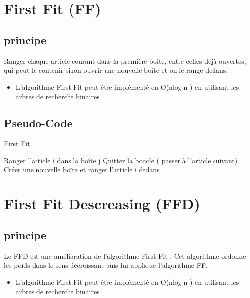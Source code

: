 \documentclass[class=article, crop=false]{standalone}
\begin{document}
\section{First Fit (FF)}
\subsection{principe}
Ranger chaque article courant dans la première boîte, entre celles déjà ouvertes, qui peut le contenir sinon ouvrir une nouvelle boîte et on le range dedans.
\begin{itemize}
    \item L’algorithme First Fit peut être implémenté en O(nlog n ) en utilisant les arbres de recherche binaires
\end{itemize}

\subsection{Pseudo-Code}
\begin{algorithm}[H]
    \caption{First Fit}
    \begin{algorithmic}
              \STATE Ranger l’article i dans la boîte j
              \STATE Quitter la boucle ( passer à l'article suivant)
             \ENDIF 
        \ENDFOR
            \STATE Créer une nouvelle boîte et ranger l’article i dedans
        \ENDIF
    \ENDFOR
    \end{algorithmic}
\end{algorithm}

\section{First Fit Descreasing (FFD)}
\subsection{principe}
Le FFD est une amélioration de l’algorithme First-Fit . Cet algorithme ordonne les poids dans le sens décroissant puis lui applique l’algorithme FF.
\begin{itemize}
    \item L’algorithme First Fit peut être implémenté en O(nlog n ) en utilisant les arbres de recherche binaires 
\end{itemize}
\end{document}
